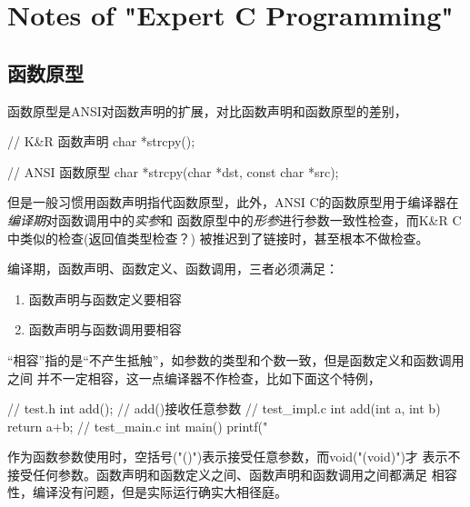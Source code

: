 ﻿\section[Notes of "Expert C Programming"]{Notes of "Expert C Programming"}

\subsection[函数原型]{函数原型}
函数原型是ANSI对函数声明的扩展，对比函数声明和函数原型的差别，

\begin{cppcode}
// K&R 函数声明
char *strcpy();

// ANSI 函数原型
char *strcpy(char *dst, const char *src);
\end{cppcode}

但是一般习惯用函数声明指代函数原型，此外，ANSI C的函数原型用于编译器在
\emph{编译期}对函数调用中的\emph{实参}和
函数原型中的\emph{形参}进行参数一致性检查，而K\&R C中类似的检查(返回值类型检查？)
被推迟到了链接时，甚至根本不做检查。

编译期，函数声明、函数定义、函数调用，三者必须满足：
\begin{enumerate}
  \item 函数声明与函数定义要相容
  \item 函数声明与函数调用要相容
\end{enumerate}
“相容”指的是“不产生抵触”，如参数的类型和个数一致，但是函数定义和函数调用之间
并不一定相容，这一点编译器不作检查，比如下面这个特例，

\begin{cppcode}
// test.h
int add(); // add()接收任意参数
// test_impl.c
int add(int a, int b) { return a+b; }
// test_main.c
int main()
{
  printf(" %
}
\end{cppcode}

作为函数参数使用时，空括号("()")表示接受任意参数，而void("(void)")才
表示不接受任何参数。函数声明和函数定义之间、函数声明和函数调用之间都满足
相容性，编译没有问题，但是实际运行确实大相径庭。